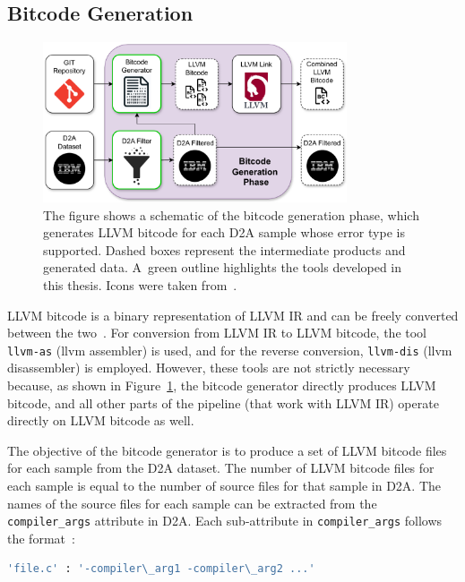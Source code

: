 \subsection{Bitcode Generation}
\label{bitcode-generation}

\begin{figure}[t]
	\centering
	\includegraphics[width=0.8\textwidth]{figures/bitcode-generation.pdf}
	\caption{The figure shows a schematic of the bitcode generation phase,  which generates LLVM bitcode for each D2A sample whose error type is supported. Dashed boxes represent the intermediate products and generated data. A~green outline highlights the tools developed in this thesis. Icons were taken from~\cite{icon-git, icon-ibm, icon-llvm}.}
	\label{figure:bitcode-generation}
\end{figure}

LLVM bitcode is a binary representation of LLVM IR and can be freely converted between the two~\cite{LLVM-bitcode}. For conversion from LLVM IR to LLVM bitcode, the tool \texttt{llvm-as} (llvm assembler) is used, and for the reverse conversion, \texttt{llvm-dis} (llvm disassembler) is employed. However, these tools are not strictly necessary because, as shown in Figure~\ref{figure:bitcode-generation}, the bitcode generator directly produces LLVM bitcode, and all other parts of the pipeline (that work with LLVM IR) operate directly on LLVM bitcode as well.

The objective of the bitcode generator is to produce a set of LLVM bitcode files for each sample from the D2A dataset. The number of LLVM bitcode files for each sample is equal to the number of source files for that sample in D2A. The names of the source files for each sample can be extracted from the \texttt{compiler\_args} attribute in D2A. Each sub-attribute in \texttt{compiler\_args} follows the format~\cite{d2a-sample-description}:

\begin{lstlisting}[language=bash, xleftmargin=2em]
'file.c' : '-compiler\_arg1 -compiler\_arg2 ...'
\end{lstlisting}


